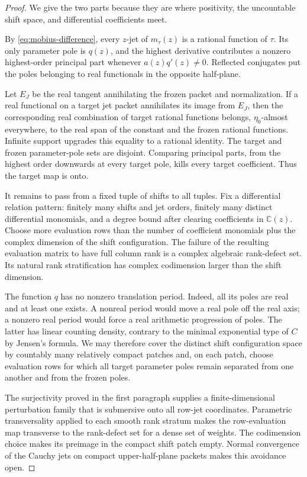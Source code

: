 \documentclass[11pt]{article}
\newcommand{\C}{\mathbb C}
\begin{document}
\begin{proof}
We give the two parts because they are where positivity, the uncountable shift space, and
differential coefficients meet.

By \eqref{eq:mobius-difference}, every $z$-jet of $m_\tau(z)$ is a rational function of $\tau$.
Its only parameter pole is $q(z)$, and the highest derivative contributes a nonzero highest-order
principal part whenever $a(z)q'(z)\neq0$.  Reflected conjugates put the poles belonging to real
functionals in the opposite half-plane.

Let $E_J$ be the real tangent annihilating the frozen packet and normalization.  If a real
functional on a target jet packet annihilates its image from $E_J$, then the corresponding real
combination of target rational functions belongs, $\eta_0$-almost everywhere, to the real span of
the constant and the frozen rational functions.  Infinite support upgrades this equality to a
rational identity.  The target and frozen parameter-pole sets are disjoint.  Comparing principal
parts, from the highest order downwards at every target pole, kills every target coefficient.
Thus the target map is onto.

It remains to pass from a fixed tuple of shifts to all tuples.  Fix a differential relation
pattern: finitely many shifts and jet orders, finitely many distinct differential monomials, and a
degree bound after clearing coefficients in $\C(z)$.  Choose more evaluation rows than the number
of coefficient monomials plus the complex dimension of the shift configuration.  The failure of
the resulting evaluation matrix to have full column rank is a complex algebraic rank-defect set.
Its natural rank stratification has complex codimension larger than the shift dimension.

The function $q$ has no nonzero translation period.  Indeed, all its poles are real and at least
one exists.  A nonreal period would move a real pole off the real axis; a nonzero real period would
force a real arithmetic progression of poles.  The latter has linear counting density, contrary
to the minimal exponential type of $C$ by Jensen's formula.  We may therefore cover the distinct
shift configuration space by countably many relatively compact patches and, on each patch, choose
evaluation rows for which all target parameter poles remain separated from one another and from
the frozen poles.

The surjectivity proved in the first paragraph supplies a finite-dimensional perturbation family
that is submersive onto all row-jet coordinates.  Parametric transversality applied to each smooth
rank stratum makes the row-evaluation map transverse to the rank-defect set for a dense set of
weights.  The codimension choice makes its preimage in the compact shift patch empty.  Normal
convergence of the Cauchy jets on compact upper-half-plane packets makes this avoidance open.


\end{proof}
\end{document}
